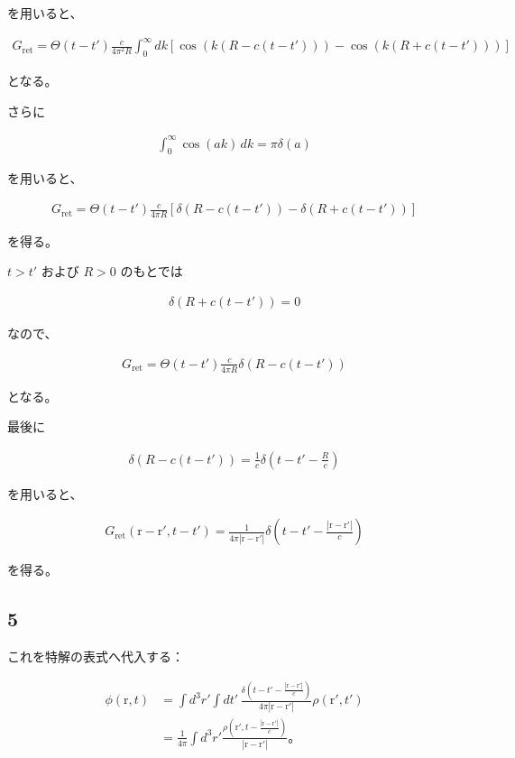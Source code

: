 \documentclass[platex,dvipdfmx,a4paper]{jsarticle}
\newcommand{\vect}[1]{\boldsymbol{\mathrm{#1}}}
\begin{document}
を用いると、

\begin{align*}
G_{\mathrm{ret}}
=
\Theta(t-t')
\frac{c}{4\pi^2R}
\int_0^\infty
dk
\left[
\cos\!\left(k(R-c(t-t'))\right)
-
\cos\!\left(k(R+c(t-t'))\right)
\right]
\end{align*}

となる。

さらに

\begin{align*}
\int_0^\infty \cos(ak)\,dk
=
\pi\delta(a)
\end{align*}

を用いると、

\begin{align*}
G_{\mathrm{ret}}
=
\Theta(t-t')
\frac{c}{4\pi R}
\left[
\delta\!\left(R-c(t-t')\right)
-
\delta\!\left(R+c(t-t')\right)
\right]
\end{align*}

を得る。

$t>t'$ および $R>0$ のもとでは

\begin{align*}
\delta\!\left(R+c(t-t')\right)=0
\end{align*}

なので、

\begin{align*}
G_{\mathrm{ret}}
=
\Theta(t-t')
\frac{c}{4\pi R}
\delta\!\left(R-c(t-t')\right)
\end{align*}

となる。

最後に

\begin{align*}
\delta\!\left(R-c(t-t')\right)
=
\frac1c
\delta\!\left(
t-t'-\frac{R}{c}
\right)
\end{align*}

を用いると、

\begin{align*}
G_{\mathrm{ret}}(\vect r-\vect r',t-t')
=
\frac{1}{4\pi|\vect r-\vect r'|}
\delta\!\left(
t-t'
-\frac{|\vect r-\vect r'|}{c}
\right)
\end{align*}

を得る。

\subsection*{5}

これを特解の表式へ代入する：

\begin{align*}
\phi(\vect r,t)
&=
\int d^3r'
\int dt'\,
\frac{
\delta\!\left(
t-t'
-\frac{|\vect r-\vect r'|}{c}
\right)
}
{4\pi|\vect r-\vect r'|}
\rho(\vect r',t') \\
&=
\frac{1}{4\pi}
\int d^3r'
\frac{
\rho\!\left(
\vect r',
t-\frac{|\vect r-\vect r'|}{c}
\right)
}
{|\vect r-\vect r'|}。
\end{align*}
\end{document}
